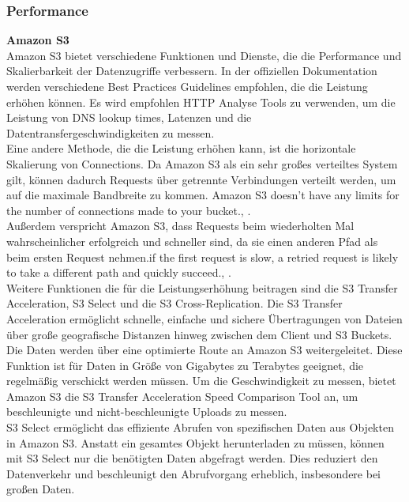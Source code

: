\newpage

\subsubsection{Performance}

\textbf{Amazon S3}\\

Amazon S3 bietet verschiedene Funktionen und Dienste, die die Performance und Skalierbarkeit der Datenzugriffe verbessern. In der offiziellen Dokumentation \cite{performance-guide} werden verschiedene Best Practices Guidelines empfohlen, die die Leistung erhöhen können. Es wird empfohlen HTTP Analyse Tools zu verwenden, um die Leistung von DNS lookup times, Latenzen und die Datentransfergeschwindigkeiten zu messen.\\

Eine andere Methode, die die Leistung erhöhen kann, ist die horizontale Skalierung von Connections. Da Amazon S3 als ein sehr großes verteiltes System gilt, können dadurch Requests über getrennte Verbindungen verteilt werden, um auf die maximale Bandbreite zu kommen. \glqq Amazon S3 doesn't have any limits for the number of connections made to your bucket.\grqq, \cite{performance-guide}.\\Außerdem verspricht Amazon S3, dass Requests beim wiederholten Mal wahrscheinlicher erfolgreich und schneller sind, da sie einen anderen Pfad als beim ersten Request nehmen.\glqq[...] if the first request is slow, a retried request is likely to take a different path and quickly succeed.\grqq, \cite{performance-guide}.\\

Weitere Funktionen die für die Leistungserhöhung beitragen sind die S3 Transfer Acceleration, S3 Select und die S3 Cross-Replication. Die S3 Transfer Acceleration ermöglicht schnelle, einfache und sichere Übertragungen von Dateien über große geografische Distanzen hinweg zwischen dem Client und S3 Buckets. Die Daten werden über eine optimierte Route an Amazon S3 weitergeleitet. Diese Funktion ist für Daten in Größe von Gigabytes zu Terabytes geeignet, die regelmäßig verschickt werden müssen. Um die Geschwindigkeit zu messen, bietet Amazon S3 die S3 Transfer Acceleration Speed Comparison Tool an, um beschleunigte und nicht-beschleunigte Uploads zu messen.\\

S3 Select ermöglicht das effiziente Abrufen von spezifischen Daten aus Objekten in Amazon S3. Anstatt ein gesamtes Objekt herunterladen zu müssen, können mit S3 Select nur die benötigten Daten abgefragt werden. Dies reduziert den Datenverkehr und beschleunigt den Abrufvorgang erheblich,  insbesondere bei großen Daten.\\

